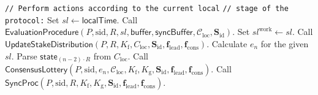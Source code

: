 \begin{protocol}
\begin{algorithmic}[1]
        \noindent
        \lstinline|// Perform actions according to the current local|
        \noindent
        \lstinline|// stage of the protocol:|
        \State Set $sl \leftarrow \textsf{localTime}$.
            \State Call $\textsf{EvaluationProcedure}(P, \text{sid}, R, sl, \textsf{buffer}, \textsf{syncBuffer}, \mathcal{C}_{\text{loc}}, \mathbf{S}_{\text{id}})$.
            \State Set $sl^{\text{work}} \leftarrow sl$.
                \State Call $\textsf{UpdateStakeDistribution}(P, R, K_{\text{f}}, C_{\text{loc}}, \mathbf{S}_{\text{id}},
                \mathbf{f}_{\text{lead}},
                \mathbf{f}_{\text{cons}})$.
                \State Calculate $e_n$ for the given $sl$.
                \State Parse $\textsf{state}_{(n - 2)\cdot R}$ from $C_{\text{loc}}$.
                    \State Call $\textsf{ConsensusLottery}(P, \text{sid}, e_n, \mathcal{C}_{\text{loc}}, K_{\text{f}}, K_{\text{g}},
                    \mathbf{S}_{\text{id}},
                    \mathbf{f}_{\text{lead}},
                    \mathbf{f}_{\text{cons}})$.
                \EndFor
                \State Call $\textsf{SyncProc}(P, \text{sid}, R, K_{\text{f}}, K_{\text{g}}, \mathbf{S}_{\text{id}},
                \mathbf{f}_{\text{lead}},
                \mathbf{f}_{\text{cons}})$.
            \EndIf
        \EndIf

    \end{algorithmic}\label{alg:main-ledger-protocol}
\end{protocol}
